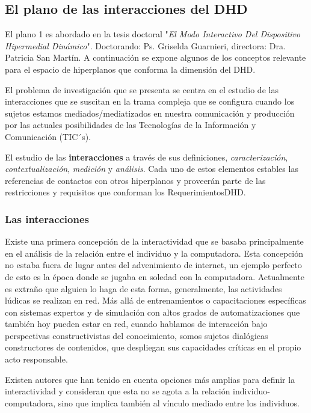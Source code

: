 \subsection{El plano de las interacciones del DHD} \label{interacciones}

El plano 1 es abordado en la tesis doctoral "\textit{El Modo Interactivo Del
Dispositivo Hipermedial Dinámico}". Doctorando: Ps. Griselda Guarnieri,
directora: Dra. Patricia San Martín. A continuación se expone algunos de los
conceptos relevante para el espacio de hiperplanos que conforma la dimensión
del DHD.

El problema de investigación que se presenta se centra en el estudio de las
interacciones que se suscitan en la trama compleja que se configura cuando los
sujetos estamos mediados/mediatizados en nuestra comunicación y producción por
las actuales posibilidades de las Tecnologías de la Información y Comunicación
(TIC´s). 

El estudio de las \textbf{interacciones} a través de sus definiciones,
 \textit{caracterización}, \textit{contextualización}, \textit{medición} y
\textit{análisis}. Cada uno de estos elementos estables las referencias de
contactos con otros hiperplanos y proveerán parte de las restricciones y
requisitos que conforman los RequerimientosDHD.

\subsubsection{Las interacciones} \label{relaciones}

Existe una primera concepción de la interactividad que se basaba principalmente
en el análisis de la relación entre el individuo y la computadora. Esta
concepción no estaba fuera de lugar antes del advenimiento de internet,
un ejemplo perfecto de esto es la época donde se jugaba en soledad con la
computadora. Actualmente es extraño que alguien lo haga de esta forma,
generalmente, las actividades lúdicas se realizan en red. Más allá de
entrenamientos o capacitaciones específicas con sistemas expertos y de
simulación con altos grados de automatizaciones que también hoy pueden estar en
red, cuando hablamos de interacción bajo perspectivas constructivistas del
conocimiento, somos sujetos dialógicas constructores de contenidos, que
despliegan sus capacidades críticas en el propio acto responsable.

Existen autores que han tenido en cuenta opciones más amplias para
definir la interactividad y consideran que esta no se agota a la relación
individuo-computadora, sino que implica también al vínculo mediado entre los
individuos.

